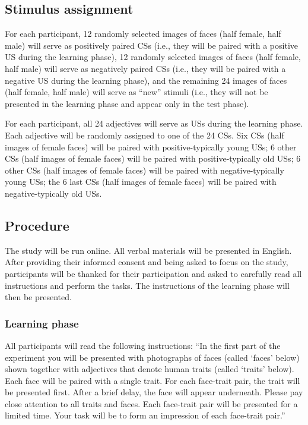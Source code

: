 \documentclass[
  doc,floatsintext]{apa6}
\begin{document}
\hypertarget{stimulus-assignment}{%
\subsection{Stimulus assignment}\label{stimulus-assignment}}

For each participant, 12 randomly selected images of faces (half female, half male) will serve as positively paired CSs (i.e., they will be paired with a positive US during the learning phase), 12 randomly selected images of faces (half female, half male) will serve as negatively paired CSs (i.e., they will be paired with a negative US during the learning phase), and the remaining 24 images of faces (half female, half male) will serve as ``new'' stimuli (i.e., they will not be presented in the learning phase and appear only in the test phase).

For each participant, all 24 adjectives will serve as USs during the learning phase.
Each adjective will be randomly assigned to one of the 24 CSs. Six CSs (half images of female faces) will be paired with positive-typically young USs; 6 other CSs (half images of female faces) will be paired with positive-typically old USs; 6 other CSs (half images of female faces) will be paired with negative-typically young USs; the 6 last CSs (half images of female faces) will be paired with negative-typically old USs.

\hypertarget{procedure}{%
\subsection{Procedure}\label{procedure}}

The study will be run online.
All verbal materials will be presented in English.
After providing their informed consent and being asked to focus on the study, participants will be thanked for their participation and asked to carefully read all instructions and perform the tasks. The instructions of the learning phase will then be presented.

\hypertarget{learning-phase}{%
\subsubsection{Learning phase}\label{learning-phase}}

All participants will read the following instructions:
``In the first part of the experiment you will be presented with photographs of faces (called `faces' below) shown together with adjectives that denote human traits (called `traits' below).
Each face will be paired with a single trait.
For each face-trait pair, the trait will be presented first.
After a brief delay, the face will appear underneath.
Please pay close attention to all traits and faces.
Each face-trait pair will be presented for a limited time.
Your task will be to form an impression of each face-trait pair.''
\end{document}
